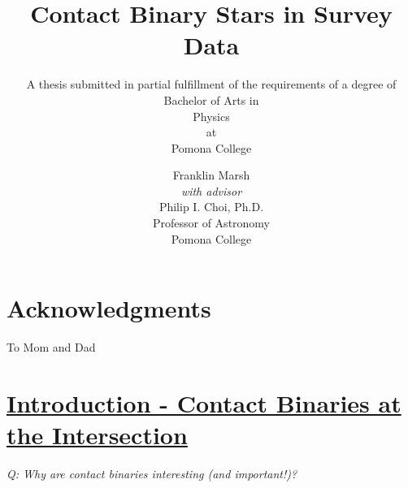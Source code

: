 \documentclass[12pt]{article} %
\title{\textbf{Contact Binary Stars in Survey Data}}
\author{Franklin Marsh\\
\small{\emph{with advisor}}\\
Philip I. Choi, Ph.D.\\
Professor of Astronomy\\ Pomona College}
\subtitle{A thesis submitted in partial fulfillment of the requirements of a degree of Bachelor of Arts
in\\
Physics\\
at\\
Pomona College}
\numberwithin{equation}{section} %
\begin{document}

\maketitle
\thispagestyle{empty}

\newpage

\thispagestyle{empty}
\begin{abstract}

\end{abstract}
\newpage


\thispagestyle{empty}
\section*{Acknowledgments}

To Mom and Dad

\newpage


\tableofcontents %

\newpage %


\section[Introduction - Contact Binaries at the Intersection]{\hyperlink{toc}{Introduction - Contact Binaries at the Intersection}} \label{sec: intro}

\emph{Q: Why are contact binaries interesting (and important!)?}
\end{document}
